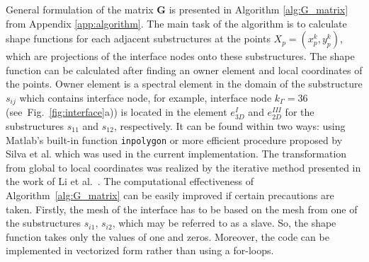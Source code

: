 General formulation of the matrix \textbf{G} is presented in Algorithm \ref{alg:G_matrix} from Appendix \ref{app:algorithm}.
The main task of the algorithm is to calculate shape functions for each adjacent substructures at the points \(X_p=(x_p^k,y_p^k)\), which are projections of the interface nodes onto these substructures.
The shape function can be calculated after finding an owner element and local coordinates of the points.
Owner element is a spectral element in the domain of the substructure \(s_{ij}\) which contains interface node, for example, interface node \(k_\Gamma=36\) (see~Fig.~\ref{fig:interface}a)) is located in the element \(e^{I}_{3D}\) and \(e^{III}_{2D}\) for the substructures \(s_{11}\) and \(s_{12}\), respectively.
It can be found within two ways: using Matlab's built-in function \verb+inpolygon+ or more efficient procedure proposed by Silva et al. \cite{silva2009exact} which was used in the current implementation.
The transformation from global to local coordinates was realized by the iterative method presented in the work of Li et al.~\cite{li2014efficient}.
The computational effectiveness of Algorithm~\ref{alg:G_matrix} can be easily improved if certain precautions are taken.
Firstly, the mesh of the interface has to be based on the mesh from one of the substructures \(s_{i1}\), \(s_{i2}\), which may be referred to as a slave.
So, the shape function takes only the values of one and zeros.
Moreover, the code can be implemented in vectorized form rather than using a for-loops.